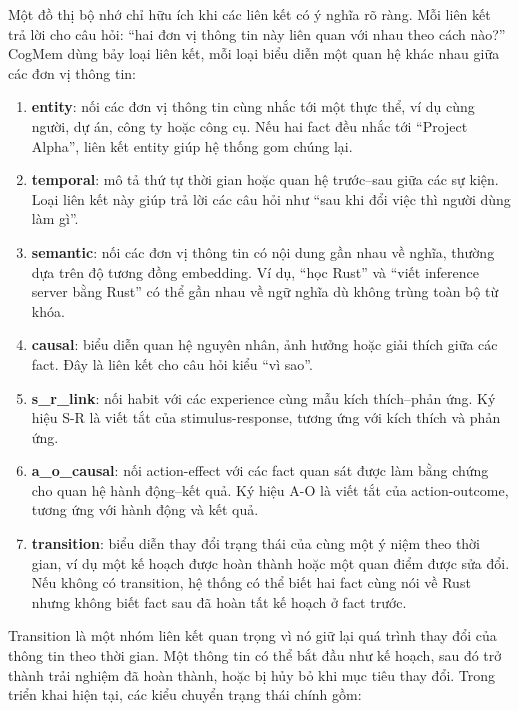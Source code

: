 \documentclass[../main.tex]{subfiles}
\begin{document}
Một đồ thị bộ nhớ chỉ hữu ích khi các liên kết có ý nghĩa rõ ràng. Mỗi liên kết trả lời cho câu hỏi: ``hai đơn vị thông tin này liên quan với nhau theo cách nào?'' CogMem dùng bảy loại liên kết, mỗi loại biểu diễn một quan hệ khác nhau giữa các đơn vị thông tin:

\begin{enumerate}
    \item \textbf{entity}: nối các đơn vị thông tin cùng nhắc tới một thực thể, ví dụ cùng người, dự án, công ty hoặc công cụ. Nếu hai fact đều nhắc tới ``Project Alpha'', liên kết entity giúp hệ thống gom chúng lại.
    \item \textbf{temporal}: mô tả thứ tự thời gian hoặc quan hệ trước--sau giữa các sự kiện. Loại liên kết này giúp trả lời các câu hỏi như ``sau khi đổi việc thì người dùng làm gì''.
    \item \textbf{semantic}: nối các đơn vị thông tin có nội dung gần nhau về nghĩa, thường dựa trên độ tương đồng embedding. Ví dụ, ``học Rust'' và ``viết inference server bằng Rust'' có thể gần nhau về ngữ nghĩa dù không trùng toàn bộ từ khóa.
    \item \textbf{causal}: biểu diễn quan hệ nguyên nhân, ảnh hưởng hoặc giải thích giữa các fact. Đây là liên kết cho câu hỏi kiểu ``vì sao''.
    \item \textbf{s\_r\_link}: nối habit với các experience cùng mẫu kích thích--phản ứng. Ký hiệu S-R là viết tắt của stimulus-response, tương ứng với kích thích và phản ứng.
    \item \textbf{a\_o\_causal}: nối action-effect với các fact quan sát được làm bằng chứng cho quan hệ hành động--kết quả. Ký hiệu A-O là viết tắt của action-outcome, tương ứng với hành động và kết quả.
    \item \textbf{transition}: biểu diễn thay đổi trạng thái của cùng một ý niệm theo thời gian, ví dụ một kế hoạch được hoàn thành hoặc một quan điểm được sửa đổi. Nếu không có transition, hệ thống có thể biết hai fact cùng nói về Rust nhưng không biết fact sau đã hoàn tất kế hoạch ở fact trước.
\end{enumerate}

Transition là một nhóm liên kết quan trọng vì nó giữ lại quá trình thay đổi của thông tin theo thời gian. Một thông tin có thể bắt đầu như kế hoạch, sau đó trở thành trải nghiệm đã hoàn thành, hoặc bị hủy bỏ khi mục tiêu thay đổi. Trong triển khai hiện tại, các kiểu chuyển trạng thái chính gồm:
\end{document}
